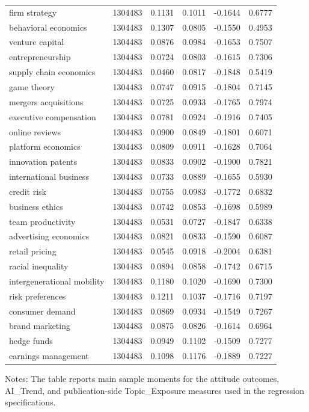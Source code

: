 \documentclass[11pt]{article}
\begin{document}
\begin{center}
\begin{longtable}{lrrrrr}
firm strategy & 1304483 & 0.1131 & 0.1011 & -0.1644 & 0.6777 \\
behavioral economics & 1304483 & 0.1307 & 0.0805 & -0.1550 & 0.4953 \\
venture capital & 1304483 & 0.0876 & 0.0984 & -0.1653 & 0.7507 \\
entrepreneurship & 1304483 & 0.0724 & 0.0803 & -0.1615 & 0.7306 \\
supply chain economics & 1304483 & 0.0460 & 0.0817 & -0.1848 & 0.5419 \\
game theory & 1304483 & 0.0747 & 0.0915 & -0.1804 & 0.7145 \\
mergers acquisitions & 1304483 & 0.0725 & 0.0933 & -0.1765 & 0.7974 \\
executive compensation & 1304483 & 0.0781 & 0.0924 & -0.1916 & 0.7405 \\
online reviews & 1304483 & 0.0900 & 0.0849 & -0.1801 & 0.6071 \\
platform economics & 1304483 & 0.0809 & 0.0911 & -0.1628 & 0.7064 \\
innovation patents & 1304483 & 0.0833 & 0.0902 & -0.1900 & 0.7821 \\
international business & 1304483 & 0.0733 & 0.0889 & -0.1655 & 0.5930 \\
credit risk & 1304483 & 0.0755 & 0.0983 & -0.1772 & 0.6832 \\
business ethics & 1304483 & 0.0742 & 0.0853 & -0.1698 & 0.5989 \\
team productivity & 1304483 & 0.0531 & 0.0727 & -0.1847 & 0.6338 \\
advertising economics & 1304483 & 0.0821 & 0.0833 & -0.1590 & 0.6087 \\
retail pricing & 1304483 & 0.0545 & 0.0918 & -0.2004 & 0.6381 \\
racial inequality & 1304483 & 0.0894 & 0.0858 & -0.1742 & 0.6715 \\
intergenerational mobility & 1304483 & 0.1180 & 0.1020 & -0.1690 & 0.7300 \\
risk preferences & 1304483 & 0.1211 & 0.1037 & -0.1716 & 0.7197 \\
consumer demand & 1304483 & 0.0869 & 0.0934 & -0.1549 & 0.7267 \\
brand marketing & 1304483 & 0.0875 & 0.0826 & -0.1614 & 0.6964 \\
hedge funds & 1304483 & 0.0949 & 0.1102 & -0.1509 & 0.7277 \\
earnings management & 1304483 & 0.1098 & 0.1176 & -0.1889 & 0.7227 \\
\end{longtable}
\end{center}
{\captionsetup{justification=raggedright,singlelinecheck=false}
\noindent\footnotesize Notes: The table reports main sample moments for the attitude outcomes, AI\_Trend, and publication-side Topic\_Exposure measures used in the regression specifications.\normalsize}
\end{document}
